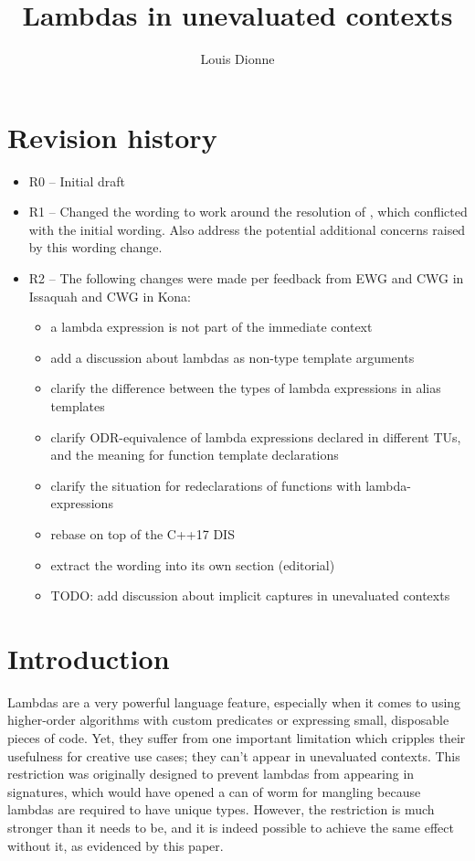 \documentclass{wg21}
\title{Lambdas in unevaluated contexts}
\author{Louis Dionne}{ldionne.2@gmail.com}
\begin{document}
\maketitle

\section{Revision history}
\begin{itemize}
  \item R0 -- Initial draft
  \item R1 -- Changed the wording to work around the resolution of \cite{DR1607},
              which conflicted with the initial wording. Also address the
              potential additional concerns raised by this wording change.
  \item R2 -- The following changes were made per feedback from EWG and CWG
              in Issaquah and CWG in Kona:
              \begin{itemize}
                \item a lambda expression is not part of the immediate context
                \item add a discussion about lambdas as non-type template arguments
                \item clarify the difference between the types of lambda expressions
                      in alias templates
                \item clarify ODR-equivalence of lambda expressions declared in
                      different TUs, and the meaning for function template
                      declarations
                \item clarify the situation for redeclarations of functions with
                      lambda-expressions
                \item rebase on top of the C++17 DIS
                \item extract the wording into its own section (editorial)
                \item TODO: add discussion about implicit captures in unevaluated
                      contexts
              \end{itemize}
\end{itemize}


\section{Introduction}
Lambdas are a very powerful language feature, especially when it comes to using
higher-order algorithms with custom predicates or expressing small, disposable
pieces of code. Yet, they suffer from one important limitation which cripples
their usefulness for creative use cases; they can't appear in unevaluated
contexts. This restriction was originally designed to prevent lambdas from
appearing in signatures, which would have opened a can of worm for mangling
because lambdas are required to have unique types. However, the restriction is
much stronger than it needs to be, and it is indeed possible to achieve the
same effect without it, as evidenced by this paper.
\end{document}
